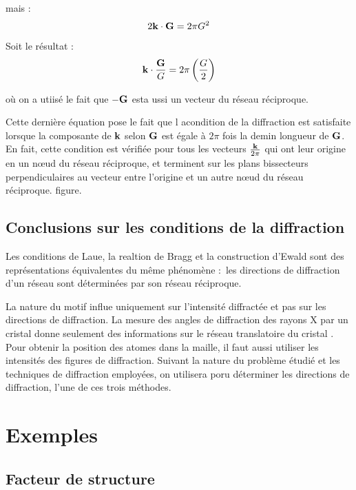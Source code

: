 mais :
\begin{equation}
    2 \mathbf{k\cdot G} = 2\pi G^2
\end{equation}

Soit le résultat :
\begin{equation}
    \mathbf{k}\cdot\frac{\mathbf{G}}{G} = 2\pi \left( \frac{G}{2} \right)
\end{equation}

où on a utiisé le fait que $-\mathbf{G}$ esta ussi un vecteur du réseau
réciproque.

Cette dernière équation pose le fait que l acondition de la diffraction est
satisfaite lorsque la composante de $\mathbf{k}$ selon $\mathbf{G}$ est égale à
$2\pi$ fois la demin longueur de $\mathbf{G}$. En fait, cette condition est
vérifiée pour tous les vecteurs $\frac{\mathbf{k}}{2\pi}$ qui ont leur origine
en un nœud du réseau réciproque, et terminent sur les plans bissecteurs
perpendiculaires au vecteur entre l'origine et un autre nœud du réseau réciproque. \TODO figure.



\subsection{Conclusions sur les conditions de la diffraction}

Les conditions de Laue, la realtion de Bragg et la construction d'Ewald sont des
représentations équivalentes du même phénomène : les directions de diffraction
d'un réseau sont déterminées par son réseau réciproque.

La nature du motif influe uniquement sur l'intensité diffractée et pas sur les
directions de diffraction. La mesure des angles de diffraction des rayons X par
un cristal donne seulement des informations sur le réseau translatoire du cristal
. Pour obtenir la position des atomes dans la maille, il faut aussi utiliser les
intensités des figures de diffraction. Suivant la nature du problème étudié et
les techniques de diffraction employées, on utilisera poru déterminer les
directions de diffraction, l'une de ces trois méthodes.

\section{Exemples}

\subsection{Facteur de structure}

